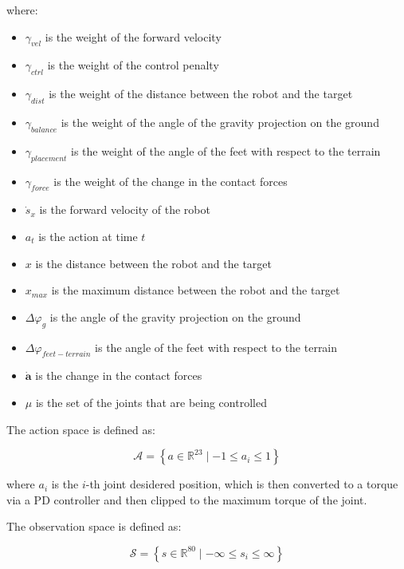 where:

\begin{itemize}
    \item $\gamma_{vel}$ is the weight of the forward velocity
    \item $\gamma_{ctrl}$ is the weight of the control penalty
    \item $\gamma_{dist}$ is the weight of the distance between the robot and the target
    \item $\gamma_{balance}$ is the weight of the angle of the gravity projection on the ground
    \item $\gamma_{placement}$ is the weight of the angle of the feet with respect to the terrain
    \item $\gamma_{force}$ is the weight of the change in the contact forces
    \item $\dot{s}_x$ is the forward velocity of the robot
    \item $a_t$ is the action at time $t$
    \item $x$ is the distance between the robot and the target
    \item $x_{max}$ is the maximum distance between the robot and the target
    \item $\Delta \varphi_g$ is the angle of the gravity projection on the ground
    \item $\Delta \varphi_{feet - terrain}$ is the angle of the feet with respect to the terrain
    \item $\mathbf{\dot{a}}$ is the change in the contact forces
    \item $\mu$ is the set of the joints that are being controlled
\end{itemize}

The action space is defined as:

\begin{equation}
    \mathcal{A} = \left\{ a \in \mathbb{R} ^{23} \mid -1 \leq a_i \leq 1 \right\}
\end{equation}

where $a_i$ is the $i$-th joint desidered position, which is then converted to a torque via a PD controller and then clipped to the maximum torque of the joint.

The observation space is defined as:

\begin{equation}
    \mathcal{S} = \left\{ s \in \mathbb{R} ^{80} \mid -\infty \leq s_i \leq \infty \right\}
\end{equation}

